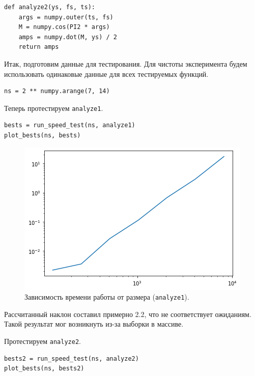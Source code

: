 \documentclass[a4paper, 14pt]{extarticle}
\begin{document}
    \begin{lstlisting}[caption= Функция \texttt{analyze2}., label={lst:task1_analyze2}]
def analyze2(ys, fs, ts):
    args = numpy.outer(ts, fs)
    M = numpy.cos(PI2 * args)
    amps = numpy.dot(M, ys) / 2
    return amps     \end{lstlisting}

    Итак, подготовим данные для тестирования. Для чистоты эксперимента будем использовать одинаковые данные для всех
    тестируемых функций.

    \begin{lstlisting}[caption= Формирование тестовых данных., label={lst:task1_data}]
ns = 2 ** numpy.arange(7, 14)   \end{lstlisting}

    Теперь протестируем \texttt{analyze1}.

    \begin{lstlisting}[caption= Тестирование \texttt{analyze1}., label={lst:task1_test_analyze1}]
bests = run_speed_test(ns, analyze1)
plot_bests(ns, bests)   \end{lstlisting}

    \begin{figure}[h]
        \centering
        \includegraphics[width=0.8\linewidth]{resources/Images/task1_test_analyze1}
        \caption{Зависимость времени работы от размера (\texttt{analyze1}).}
        \label{fig:task1_test_analyze1}
    \end{figure}

    Рассчитанный наклон составил примерно 2.2, что не соответствует ожиданиям.
    Такой результат мог возникнуть из-за выборки в массиве.

    Протестируем \texttt{analyze2}.

    \begin{lstlisting}[caption= Тестирование \texttt{analyze1}., label={lst:task1_test_analyze2}]
bests2 = run_speed_test(ns, analyze2)
plot_bests(ns, bests2)  \end{lstlisting}
\end{document}
